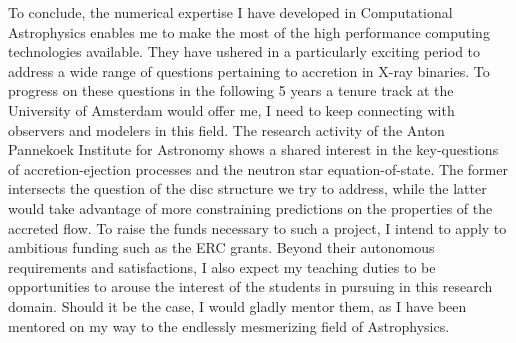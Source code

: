 \documentclass[a4paper,12pt,onecolumn]{article}
\begin{document}
To conclude, the numerical expertise I have developed in Computational Astrophysics enables me to make the most of the high performance computing technologies available. They have ushered in a particularly exciting period to address a wide range of questions pertaining to accretion in X-ray binaries. To progress on these questions in the following 5 years a tenure track at the University of Amsterdam would offer me, I need to keep connecting with observers and modelers in this field. The research activity of the Anton Pannekoek Institute for Astronomy shows a shared interest in the key-questions of accretion-ejection processes and the neutron star equation-of-state. The former intersects the question of the disc structure we try to address, while the latter would take advantage of more constraining predictions on the properties of the accreted flow. To raise the funds necessary to such a project, I intend to apply to ambitious funding such as the ERC grants. Beyond their autonomous requirements and satisfactions, I also expect my teaching duties to be opportunities to arouse the interest of the students in pursuing in this research domain. Should it be the case, I would gladly mentor them, as I have been mentored on my way to the endlessly mesmerizing field of Astrophysics. 


%
%

\newpage

\setlength{\bibsep}{5pt}
\small



\newpage

\phantom{n}
\end{document}
